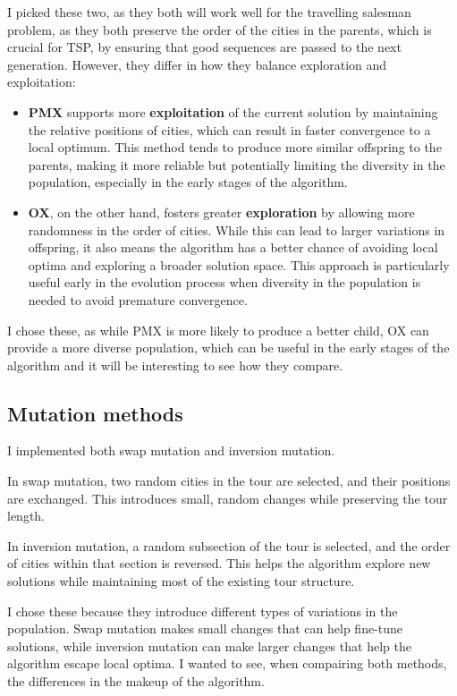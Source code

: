 \documentclass[11pt]{scrartcl} %
\begin{document}
I picked these two, as they both will work well for the travelling salesman problem, as they both preserve the order of the cities in the parents, which is crucial for TSP, by ensuring that good sequences are passed to the next generation. However, they differ in how they balance exploration and exploitation:

\begin{itemize}
    \item \textbf{PMX} supports more \textbf{exploitation} of the current solution by maintaining the relative positions of cities, which can result in faster convergence to a local optimum. This method tends to produce more similar offspring to the parents, making it more reliable but potentially limiting the diversity in the population, especially in the early stages of the algorithm.
    
    \item \textbf{OX}, on the other hand, fosters greater \textbf{exploration} by allowing more randomness in the order of cities. While this can lead to larger variations in offspring, it also means the algorithm has a better chance of avoiding local optima and exploring a broader solution space. This approach is particularly useful early in the evolution process when diversity in the population is needed to avoid premature convergence.
\end{itemize}

I chose these, as while PMX is more likely to produce a better child, OX can provide a more diverse population, which can be useful in the early stages of the algorithm and it will be interesting to see how they compare.

\subsection{Mutation methods}

I implemented both swap mutation and inversion mutation.

In swap mutation, two random cities in the tour are selected, and their positions are exchanged. This introduces small, random changes while preserving the tour length.

In inversion mutation, a random subsection of the tour is selected, and the order of cities within that section is reversed. This helps the algorithm explore new solutions while maintaining most of the existing tour structure.

I chose these because they introduce different types of variations in the population. Swap mutation makes small changes that can help fine-tune solutions, while inversion mutation can make larger changes that help the algorithm escape local optima. 
I wanted to see, when compairing both methods, the differences in the makeup of the algorithm.
\end{document}
